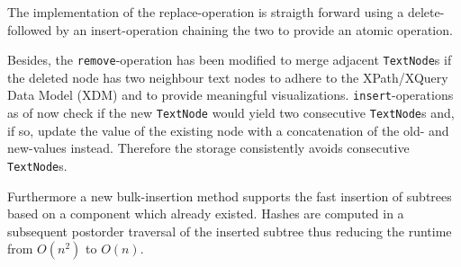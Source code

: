 


The implementation of the replace-operation is straigth forward using a delete- followed by an insert-operation chaining the two to provide an atomic operation.

Besides, the \texttt{remove}-operation has been modified to merge adjacent \texttt{TextNode}s if the deleted node has two neighbour text nodes to adhere to the XPath/XQuery Data Model (XDM) and to provide meaningful visualizations. \texttt{insert}-operations as of now check if the new \texttt{TextNode} would yield two consecutive \texttt{TextNode}s and, if so, update the value of the existing node with a concatenation of the old- and new-values instead. Therefore the storage consistently avoids consecutive \texttt{TextNode}s. 

Furthermore a new bulk-insertion method supports the fast insertion of subtrees based on a component which already existed. Hashes are computed in a subsequent postorder traversal of the inserted subtree thus reducing the runtime from $O(n^2)$ to $O(n)$.

